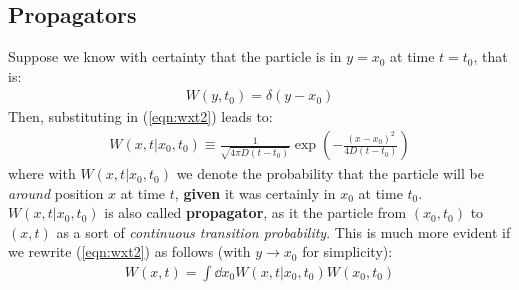 \documentclass[../template.tex]{subfiles}
\begin{document}
\subsection{Propagators}
Suppose we know with certainty that the particle is in $y = x_0 $ at time $t = t_0$, that is:
\begin{align*}
    W(y, t_0) = \delta(y - x_0)
\end{align*}
Then, substituting in (\ref{eqn:wxt2}) leads to:
\begin{align}
    W(x,t | x_0, t_0) \equiv \frac{1}{\sqrt{4 \pi D (t-t_0 )}} \exp \left(-\frac{(x-x_0)^2}{4 D (t-t_0 )} \right) 
    \label{eqn:prop}
\end{align}
where with $W(x,t|x_0, t_0)$ we denote the probability that the particle will be \textit{around}  position $x$ at time $t$, \textbf{given} it was certainly in $x_0 $ at time $t_0$. $W(x,t|x_0, t_0)$ is also called \textbf{propagator}, as it  the particle from $(x_0 , t_0 )$ to $(x,t)$ as a sort of \textit{continuous transition probability}. This is much more evident if we rewrite (\ref{eqn:wxt2}) as follows (with $y \to x_0$ for simplicity):
\begin{align}
    W(x,t) = \int \dd{x_0 } W(x,t|x_0, t_0) W(x_0, t_0)
    \label{eqn:propagator}
\end{align} 
\end{document}
